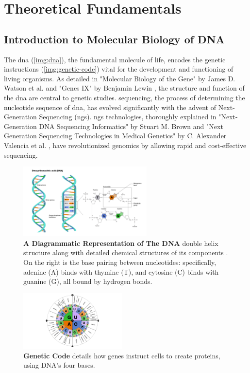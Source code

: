 \chapter{Theoretical Fundamentals} 

\section{Introduction to Molecular Biology of DNA}

The \gls{dna} (\autoref{img:dna}), the fundamental molecule of life, encodes the genetic instructions (\autoref{img:genetic-code}) vital for the development and functioning of living organisms. As detailed in "Molecular Biology of the Gene" by James D. Watson et al. \cite{Watson2013} and "Genes IX" by Benjamin Lewin \cite{Lewin2007}, the structure and function of the \gls{dna} are central to genetic studies. \gls{sequencing}, the process of determining the nucleotide sequence of \gls{dna}, has evolved significantly with the advent of Next-Generation Sequencing (\gls{ngs}). \gls{ngs} technologies, thoroughly explained in "Next-Generation DNA Sequencing Informatics" by Stuart M. Brown \cite{Brown2013} and "Next Generation Sequencing Technologies in Medical Genetics" by C. Alexander Valencia et al. \cite{Valencia2013}, have revolutionized genomics by allowing rapid and cost-effective \gls{sequencing}.

\begin{figure}[ht]
  \centering
  \includegraphics[width=0.6\textwidth]{resources/images/DNA-transparent.png}
  \caption{\textbf{A Diagrammatic Representation of The DNA} double helix structure along with detailed chemical structures of its components \cite{NHGRI2024-DNA}. On the right is the base pairing between nucleotides: specifically, adenine (A) binds with thymine (T), and cytosine (C) binds with guanine (G), all bound by hydrogen bonds.}
  \label{img:dna}
\end{figure}


\begin{figure}  
  \centering
  \includegraphics[width=0.48\textwidth]{resources/images/genetic-code.png} 
  \caption{\textbf{Genetic Code}  \cite{NHGRI2024-Code}  details how genes instruct cells to create proteins, using DNA's four bases.}
  \label{img:genetic-code}
\end{figure}




